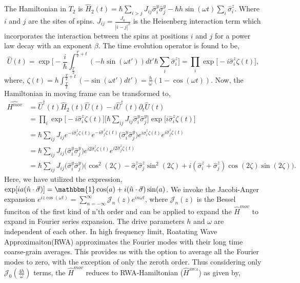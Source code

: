 \documentclass[%
nofootinbib,
reprint,
superscriptaddress,
amsmath,amssymb,showkeys,
aps,
prb,
]{revtex4-2}
\begin{document}
	The Hamiltonian in $T_2$ is $\displaystyle \hat{H}_2(t) = \hbar\sum_{i>j} J_{ij}\hat{\sigma}^y_i\hat{\sigma}^y_j - \hbar h \sin(\omega t) \sum_i \hat{\sigma}^z_i$.
	Where $i$ and $j$ are the sites of spins. $J_{ij} = \frac{J_0}{|i-j|^\beta}$ is the Heisenberg interaction term which incorporates the interaction between the spins at positions  $i$ and $j$ for a power law decay with an exponent $\beta$. 
	The time evolution operator is found to be,
	\begin{equation}
		\hat{U}(t) = \exp \bigg[-\frac{i}{\hbar}\int_{\frac{T}{2}}^{\frac{T}{2}+t} (-h \sin(\omega t'))dt' \hbar\sum_i\hat{\sigma}^z_i\bigg]
		=\prod_{i} \exp\big[-i \hat{\sigma}^z_i\zeta(t)\big],
	\end{equation}
	where, $\displaystyle \zeta (t) = h\int_{\frac{T}{2}}^{\frac{T}{2}+t}  (-\sin(\omega t')dt') =\frac{h}{\omega}(1-\cos(\omega t))$.
	Now, the Hamiltonian in moving frame can be transformed to\cite{haldar_statistical_2022},
	\begin{align}
		\hat{H^{mov}} &= \hat{U}^\dagger(t) \hat{H}_2(t) \hat{U}(t)- i \hat{U}^\dagger(t) \partial_t \hat{U}(t) \nonumber\\
		&= \prod_{i} \exp\big[-i\hat{\sigma}^z_i \zeta(t)\big] \big[\hbar\sum_{ij}J_{ij}\hat{\sigma}^y_i\hat{\sigma}^y_j\big] \exp\big[ i\hat{\sigma}^z_i \zeta(t)\big]\nonumber\\
		&= \hbar\sum_{ij} J_{ij} e^{-i\hat{\sigma}^z_i \zeta(t)} e^{-i\hat{\sigma}^z_j  \zeta(t)}\Big(\hat{\sigma}^y_i\hat{\sigma}^y_j\Big)e^{i\hat{\sigma}^z_i \zeta(t)} e^{i\hat{\sigma}^z_j \zeta(t)}\nonumber\\
		&= \hbar\sum_{ij} J_{ij} \Big(\hat{\sigma}^y_i\hat{\sigma}^y_j\Big)e^{i2\hat{\sigma}^z_i \zeta(t)} e^{i2\hat{\sigma}^z_j \zeta(t)}\nonumber\\
		&= \hbar\sum_{ij} J_{ij} \Big(\hat{\sigma}^y_i\hat{\sigma}^y_j\Big) \Big(\cos^2(2\zeta) -\hat{\sigma}^z_i\hat{\sigma}^z_j \sin^2(2\zeta) + i (\hat{\sigma}^z_i + \hat{\sigma}^z_j)\cos(2\zeta)\sin(2\zeta)\Big).
		\label{eq:hmovap1}
	\end{align}
	Here, we have utilized the expression, $\displaystyle \exp[ia(\hat{n}\cdot\vec{\sigma})] = \mathbbm{1} \cos(a) + i (\hat{n}\cdot\vec{\sigma})\sin(a)$.	We invoke the Jacobi-Anger expansion $\displaystyle e^{iz\cos(\omega t)} = \sum_{n=-\infty}^{\infty}\mathcal{J}_n(z)e^{in\omega t}$\cite{arfkenmath}, where $\mathcal{J}_n(z)$ is the Bessel funciton of the first kind of n'th order and can be applied to expand the $\hat{H}^{mov}$ to expand in Fourier series expansion. The drive parameters $h$ and $\omega$ are independent of each other. In high frequency limit, Roatating Wave Approximaiton(RWA) approximates the Fourier modes with their long time  coarse-grain averages. This provides us with the option to average all the Fourier modes to zero, with the exception of only the zeroth order. Thus considering only $\mathcal{J}_0\left(\frac{4h}{\omega}\right)$ terms, the $\hat{H}^{mov}$ reduces to RWA-Hamiltonian ($\hat{H}^{_{RWA}}$) as given by,
\end{document}
